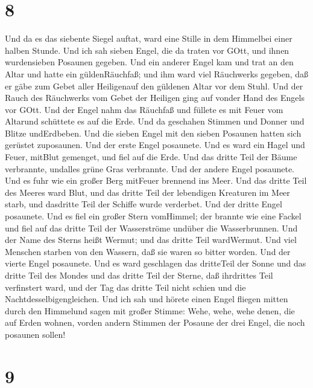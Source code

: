 \hypertarget{section-6}{%
\section{8}\label{section-6}}

 Und da es das siebente Siegel auftat, ward eine Stille in
dem Himmelbei einer halben Stunde.  Und ich sah sieben
Engel, die da traten vor GOtt, und ihnen wurdensieben Posaunen gegeben.
 Und ein anderer Engel kam und trat an den Altar und hatte
ein güldenRäuchfaß; und ihm ward viel Räuchwerks gegeben, daß er gäbe
zum Gebet aller Heiligenauf den güldenen Altar vor dem Stuhl.
 Und der Rauch des Räuchwerks vom Gebet der Heiligen ging
auf vonder Hand des Engels vor GOtt.  Und der Engel nahm das
Räuchfaß und füllete es mit Feuer vom Altarund schüttete es auf die
Erde. Und da geschahen Stimmen und Donner und Blitze undErdbeben.
 Und die sieben Engel mit den sieben Posaunen hatten sich
gerüstet zuposaunen.  Und der erste Engel posaunete. Und es
ward ein Hagel und Feuer, mitBlut gemenget, und fiel auf die Erde. Und
das dritte Teil der Bäume verbrannte, undalles grüne Gras verbrannte.
 Und der andere Engel posaunete. Und es fuhr wie ein großer
Berg mitFeuer brennend ins Meer. Und das dritte Teil des Meeres ward
Blut,  und das dritte Teil der lebendigen Kreaturen im Meer
starb, und dasdritte Teil der Schiffe wurde verderbet.  Und
der dritte Engel posaunete. Und es fiel ein großer Stern vomHimmel; der
brannte wie eine Fackel und fiel auf das dritte Teil der Wasserströme
undüber die Wasserbrunnen.  Und der Name des Sterns heißt
Wermut; und das dritte Teil wardWermut. Und viel Menschen starben von
den Wassern, daß sie waren so bitter worden.  Und der
vierte Engel posaunete. Und es ward geschlagen das dritteTeil der Sonne
und das dritte Teil des Mondes und das dritte Teil der Sterne, daß
ihrdrittes Teil verfinstert ward, und der Tag das dritte Teil nicht
schien und die Nachtdesselbigengleichen.  Und ich sah und
hörete einen Engel fliegen mitten durch den Himmelund sagen mit großer
Stimme: Wehe, wehe, wehe denen, die auf Erden wohnen, vorden andern
Stimmen der Posaune der drei Engel, die noch posaunen sollen!

\hypertarget{section-7}{%
\section{9}\label{section-7}}

